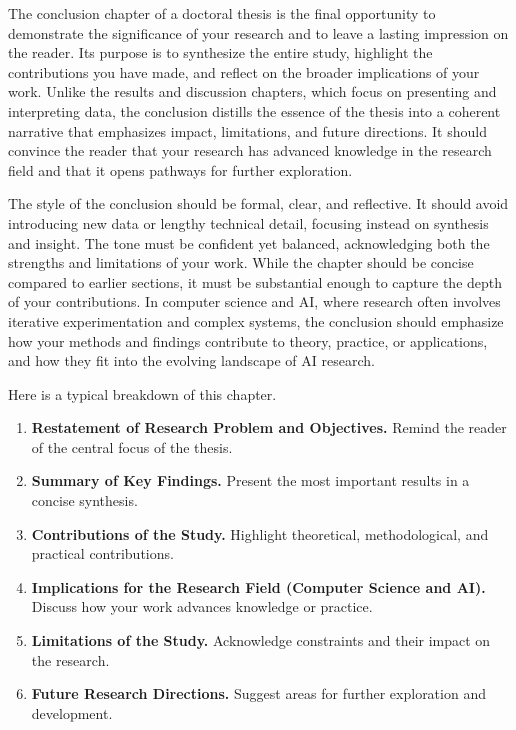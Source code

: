 \documentclass[PCOM,Thesis,Review]{mpThesis}
\newcommand{\Hd}[1]{{\color{SteelBlue}\bf#1.}}
\begin{document}
\begin{MainMatter}
\begin{Remark}
The conclusion chapter of a doctoral thesis is the final opportunity to demonstrate the significance of your research and to leave a lasting impression on the reader.
Its purpose is to synthesize the entire study, highlight the contributions you have made, and reflect on the broader implications of your work.
Unlike the results and discussion chapters, which focus on presenting and interpreting data,
the conclusion distills the essence of the thesis into a coherent narrative that emphasizes impact, limitations, and future directions.
It should convince the reader that your research has advanced knowledge in the research field and that it opens pathways for further exploration.

The style of the conclusion should be formal, clear, and reflective.
It should avoid introducing new data or lengthy technical detail, focusing instead on synthesis and insight.
The tone must be confident yet balanced, acknowledging both the strengths and limitations of your work.
While the chapter should be concise compared to earlier sections, it must be substantial enough to capture the depth of your contributions.
In computer science and AI, where research often involves iterative experimentation and complex systems,
the conclusion should emphasize how your methods and findings contribute to theory, practice, or applications, and how they fit into the evolving landscape of AI research.

Here is a typical breakdown of this chapter.
\begin{enumerate}
\item \Hd{Restatement of Research Problem and Objectives}
Remind the reader of the central focus of the thesis.

\item \Hd{Summary of Key Findings}
Present the most important results in a concise synthesis.

\item \Hd{Contributions of the Study}
Highlight theoretical, methodological, and practical contributions.

\item \Hd{Implications for the Research Field (Computer Science and AI)}
Discuss how your work advances knowledge or practice.

\item \Hd{Limitations of the Study}
Acknowledge constraints and their impact on the research.

\item \Hd{Future Research Directions}
Suggest areas for further exploration and development.


\end{enumerate}
\end{Remark}
\end{MainMatter}
\end{document}
